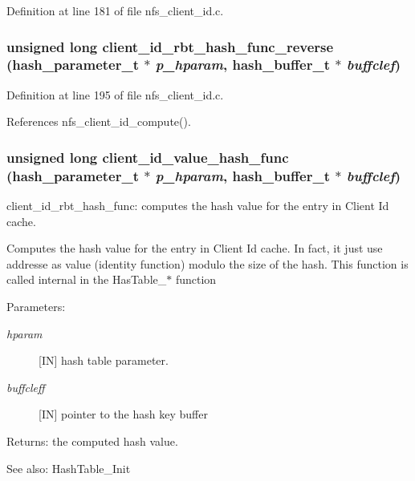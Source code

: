 Definition at line 181 of file nfs\_\-client\_\-id.c.
\subsubsection{\setlength{\rightskip}{0pt plus 5cm}unsigned long client\_\-id\_\-rbt\_\-hash\_\-func\_\-reverse (hash\_\-parameter\_\-t $\ast$ {\em p\_\-hparam}, hash\_\-buffer\_\-t $\ast$ {\em buffclef})}\label{nfs__client__id_8c_a7}




Definition at line 195 of file nfs\_\-client\_\-id.c.

References nfs\_\-client\_\-id\_\-compute().
\subsubsection{\setlength{\rightskip}{0pt plus 5cm}unsigned long client\_\-id\_\-value\_\-hash\_\-func (hash\_\-parameter\_\-t $\ast$ {\em p\_\-hparam}, hash\_\-buffer\_\-t $\ast$ {\em buffclef})}\label{nfs__client__id_8c_a4}


client\_\-id\_\-rbt\_\-hash\_\-func: computes the hash value for the entry in Client Id cache.

Computes the hash value for the entry in Client Id cache. In fact, it just use addresse as value (identity function) modulo the size of the hash. This function is called internal in the Has\-Table\_\-$\ast$ function

\begin{Desc}
\item[Parameters:]
\begin{description}
\item[{\em hparam}][IN] hash table parameter. \item[{\em buffcleff}][IN] pointer to the hash key buffer\end{description}
\end{Desc}
\begin{Desc}
\item[Returns:]the computed hash value.\end{Desc}
\begin{Desc}
\item[See also:]Hash\-Table\_\-Init \end{Desc}


